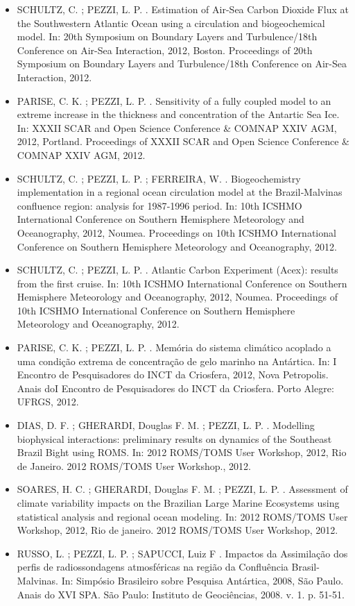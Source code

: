 \documentclass[11pt, a4paper]{awesome-cv}
\begin{document}
\begin{cvletter}
\begin{itemize}
\item[] SCHULTZ, C. ; PEZZI, L. P. . Estimation of Air-Sea Carbon Dioxide Flux at the Southwestern Atlantic Ocean using a circulation and biogeochemical model. In: 20th Symposium on Boundary Layers and Turbulence/18th Conference on Air-Sea Interaction, 2012, Boston. Proceedings of 20th Symposium on Boundary Layers and Turbulence/18th Conference on Air-Sea Interaction, 2012. 
\item[] PARISE, C. K. ; PEZZI, L. P. . Sensitivity of a fully coupled model to an extreme increase in the thickness and concentration of the Antartic Sea Ice. In: XXXII SCAR and Open Science Conference \& COMNAP XXIV AGM, 2012, Portland. Proceedings of XXXII SCAR and Open Science Conference \& COMNAP XXIV AGM, 2012. 
\item[] SCHULTZ, C. ; PEZZI, L. P. ; FERREIRA, W. . Biogeochemistry implementation in a regional ocean circulation model at the Brazil‐Malvinas confluence region: analysis for 1987‐1996 period. In: 10th ICSHMO International Conference on Southern Hemisphere Meteorology and Oceanography, 2012, Noumea. Proceedings on 10th ICSHMO International Conference on Southern Hemisphere Meteorology and Oceanography, 2012. 
\item[] SCHULTZ, C. ; PEZZI, L. P. . Atlantic Carbon Experiment (Acex): results from the first cruise. In: 10th ICSHMO International Conference on Southern Hemisphere Meteorology and Oceanography, 2012, Noumea. Proceedings of 10th ICSHMO International Conference on Southern Hemisphere Meteorology and Oceanography, 2012. 
\item[] PARISE, C. K. ; PEZZI, L. P. . Memória do sistema climático acoplado a uma condição extrema de concentração de gelo marinho na Antártica. In: I Encontro de Pesquisadores do INCT da Criosfera, 2012, Nova Petropolis. Anais doI Encontro de Pesquisadores do INCT da Criosfera. Porto Alegre: UFRGS, 2012.
\item[] DIAS, D. F. ; GHERARDI, Douglas F. M. ; PEZZI, L. P. . Modelling biophysical interactions: preliminary results on dynamics of the Southeast Brazil Bight using ROMS. In: 2012 ROMS/TOMS User Workshop, 2012, Rio de Janeiro. 2012 ROMS/TOMS User Workshop., 2012. 
\item[] SOARES, H. C. ; GHERARDI, Douglas F. M. ; PEZZI, L. P. . Assessment of climate variability impacts on the Brazilian Large Marine Ecosystems using statistical analysis and regional ocean modeling. In: 2012 ROMS/TOMS User Workshop, 2012, Rio de janeiro. 2012 ROMS/TOMS User Workshop, 2012. 
\item[] RUSSO, L. ; PEZZI, L. P. ; SAPUCCI, Luiz F . Impactos da Assimilação dos perfis de radiossondagens atmosféricas na região da Confluência Brasil-Malvinas. In: Simpósio Brasileiro sobre Pesquisa Antártica, 2008, São Paulo. Anais do XVI SPA. São Paulo: Instituto de Geociências, 2008. v. 1. p. 51-51. 

\end{itemize}
\end{cvletter}
\end{document}
